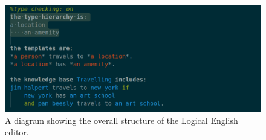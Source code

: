 \documentclass[../main.tex]{subfiles}
\begin{document}
\begin{figure}[h!]
\centering
\includegraphics[width = \linewidth]{./figures/type-hierarchy.png}
\caption{A diagram showing the overall structure of the Logical English editor.}
\label{fig:system-overview}
\end{figure}
\end{document}
